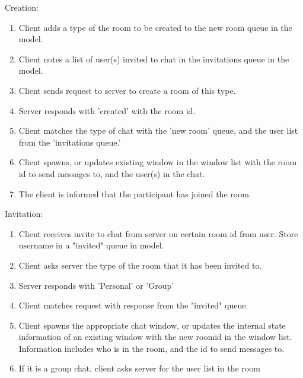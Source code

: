 Creation:
\begin{enumerate}
\item Client adds a type of the room to be created to the new room queue in the model.
\item Client notes a list of user(s) invited to chat in the invitations queue in the model.
\item Client sends request to server to create a room of this type.
\item Server responds with 'created' with the room id.
\item Client matches the type of chat with the 'new room' queue, and the user list from the 'invitations queue.'
\item Client spawns, or updates existing window in the window list with the room id to send messages to, and the user(s) in the chat.
\item The client is informed that the participant has joined the room.
\end{enumerate}

Invitation:
\begin{enumerate}
\item Client receives invite to chat from server on certain room id from user. Store username in a "invited" queue in model.  
\item Client asks server the type of the room that it has been invited to. 
\item Server responds with 'Personal' or 'Group'
\item Client matches request with response from the "invited" queue.
\item Client spawns the appropriate chat window, or updates the internal state information of an existing window with the new roomid in the window list. Information includes who is in the room, and the id to send messages to.
\item If it is a group chat, client asks server for the user list in the room
\end{enumerate}

